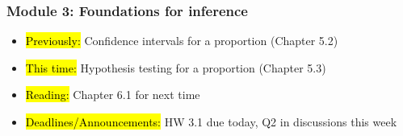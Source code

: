 
\begin{frame}
    \frametitle{Module 3: Foundations for inference}
    \begin{itemize}
        \item \hl{Previously: }Confidence intervals for a proportion (Chapter 5.2)
        \item \hl{This time: }Hypothesis testing for a proportion (Chapter 5.3)
        \item \hl{Reading: }Chapter 6.1 for next time
        \item \hl{Deadlines/Announcements: }HW 3.1 due today, Q2 in discussions this week
    \end{itemize}
    
\end{frame}